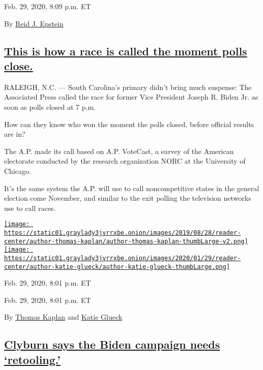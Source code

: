 Feb. 29, 2020, 8:09 p.m. ET

By \href{https://www.nytimes3xbfgragh.onion/by/reid-j-epstein}{Reid J.
Epstein}

\hypertarget{this-is-how-a-race-is-called-the-moment-polls-close}{%
\subsection{\texorpdfstring{\protect\hyperlink{this-is-how-a-race-is-called-the-moment-polls-close}{This
is how a race is called the moment polls
close.}}{This is how a race is called the moment polls close.}}\label{this-is-how-a-race-is-called-the-moment-polls-close}}

RALEIGH, N.C. --- South Carolina's primary didn't bring much suspense:
The Associated Press called the race for former Vice President Joseph R.
Biden Jr. as soon as polls closed at 7 p.m.

How can they know who won the moment the polls closed, before official
results are in?

The A.P. made its call based on A.P. VoteCast, a survey of the American
electorate conducted by the research organization NORC at the University
of Chicago.

It's the same system the A.P. will use to call noncompetitive states in
the general election come November, and similar to the exit polling the
television networks use to call races.

\href{https://www.nytimes3xbfgragh.onion/by/thomas-kaplan}{\texttt{[image: https://static01.graylady3jvrrxbe.onion/images/2019/08/28/reader-center/author-thomas-kaplan/author-thomas-kaplan-thumbLarge-v2.png]}}\href{https://www.nytimes3xbfgragh.onion/by/katie-glueck}{\texttt{[image: https://static01.graylady3jvrrxbe.onion/images/2020/01/29/reader-center/author-katie-glueck/author-katie-glueck-thumbLarge.png]}}

Feb. 29, 2020, 8:01 p.m. ET

Feb. 29, 2020, 8:01 p.m. ET

By \href{https://www.nytimes3xbfgragh.onion/by/thomas-kaplan}{Thomas
Kaplan} and
\href{https://www.nytimes3xbfgragh.onion/by/katie-glueck}{Katie Glueck}

\hypertarget{clyburn-says-the-biden-campaign-needs-retooling}{%
\subsection{\texorpdfstring{\protect\hyperlink{clyburn-says-the-biden-campaign-needs-retooling}{Clyburn
says the Biden campaign needs
`retooling.'}}{Clyburn says the Biden campaign needs `retooling.'}}\label{clyburn-says-the-biden-campaign-needs-retooling}}

